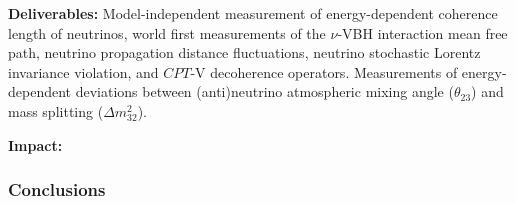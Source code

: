 \documentclass[a4paper,11pt]{article}
\begin{document}



\textbf{Deliverables:} Model-independent measurement of energy-dependent coherence length of neutrinos, world first measurements of the $\nu$-VBH interaction mean free path, neutrino propagation distance fluctuations, neutrino stochastic Lorentz invariance violation, and $CPT$-V decoherence operators. Measurements of energy-dependent deviations between (anti)neutrino atmospheric mixing angle ($\theta_{23}$) and mass splitting ($\Delta m^2_{32}$).

\textbf{Impact:}  \\

\subsubsection{Conclusions}


\end{document}
